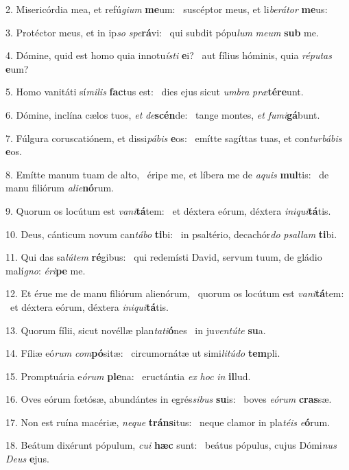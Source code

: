 2. Misericórdia mea, et refú\textit{gi}\textit{um} \textbf{me}um: \ast\  suscéptor meus, et li\textit{be}\textit{rá}\textit{tor} \textbf{me}us:\

3. Protéctor meus, et in ip\textit{so} \textit{spe}\textbf{rá}vi: \ast\  qui subdit pópu\textit{lum} \textit{me}\textit{um} \textbf{sub} me.\

4. Dómine, quid est homo quia innotu\textit{ís}\textit{ti} \textbf{e}i? \ast\  aut fílius hóminis, quia \textit{ré}\textit{pu}\textit{tas} \textbf{e}um?\

5. Homo vanitáti sí\textit{mi}\textit{lis} \textbf{fac}tus est: \ast\  dies ejus sicut \textit{um}\textit{bra} \textit{præ}\textbf{tér}\textbf{e}unt.\

6. Dómine, inclína cælos tuos, \textit{et} \textit{de}\textbf{scén}de: \ast\  tange montes, \textit{et} \textit{fu}\textit{mi}\textbf{gá}bunt.\

7. Fúlgura coruscatiónem, et dissi\textit{pá}\textit{bis} \textbf{e}os: \ast\  emítte sagíttas tuas, et con\textit{tur}\textit{bá}\textit{bis} \textbf{e}os.\

8. Emítte manum tuam de alto, \dag\  éripe me, et líbera me de \textit{a}\textit{quis} \textbf{mul}tis: \ast\  de manu filiórum \textit{a}\textit{li}\textit{e}\textbf{nó}rum.\

9. Quorum os locútum est \textit{va}\textit{ni}\textbf{tá}tem: \ast\  et déxtera eórum, déxtera \textit{in}\textit{i}\textit{qui}\textbf{tá}tis.\

10. Deus, cánticum novum can\textit{tá}\textit{bo} \textbf{ti}bi: \ast\  in psaltério, decachór\textit{do} \textit{psal}\textit{lam} \textbf{ti}bi.\

11. Qui das sa\textit{lú}\textit{tem} \textbf{ré}gibus: \ast\  qui redemísti David, servum tuum, de gládio malí\textit{gno}: \textit{é}\textit{ri}\textbf{pe} me.\

12. Et érue me de manu filiórum alienórum, \dag\  quorum os locútum est \textit{va}\textit{ni}\textbf{tá}tem: \ast\  et déxtera eórum, déxtera \textit{in}\textit{i}\textit{qui}\textbf{tá}tis.\

13. Quorum fílii, sicut novéllæ plan\textit{ta}\textit{ti}\textbf{ó}nes \ast\  in ju\textit{ven}\textit{tú}\textit{te} \textbf{su}a.\

14. Fíliæ eó\textit{rum} \textit{com}\textbf{pó}sitæ: \ast\  circumornátæ ut simi\textit{li}\textit{tú}\textit{do} \textbf{tem}pli.\

15. Promptuária e\textit{ó}\textit{rum} \textbf{ple}na: \ast\  eructántia \textit{ex} \textit{hoc} \textit{in} \textbf{il}lud.\

16. Oves eórum fœtósæ, abundántes in egrés\textit{si}\textit{bus} \textbf{su}is: \ast\  boves \textit{e}\textit{ó}\textit{rum} \textbf{cras}sæ.\

17. Non est ruína macériæ, \textit{ne}\textit{que} \textbf{tráns}itus: \ast\  neque clamor in pla\textit{té}\textit{is} \textit{e}\textbf{ó}rum.\

18. Beátum dixérunt pópulum, \textit{cu}\textit{i} \textbf{hæc} sunt: \ast\  beátus pópulus, cujus Dómi\textit{nus} \textit{De}\textit{us} \textbf{e}jus.\

